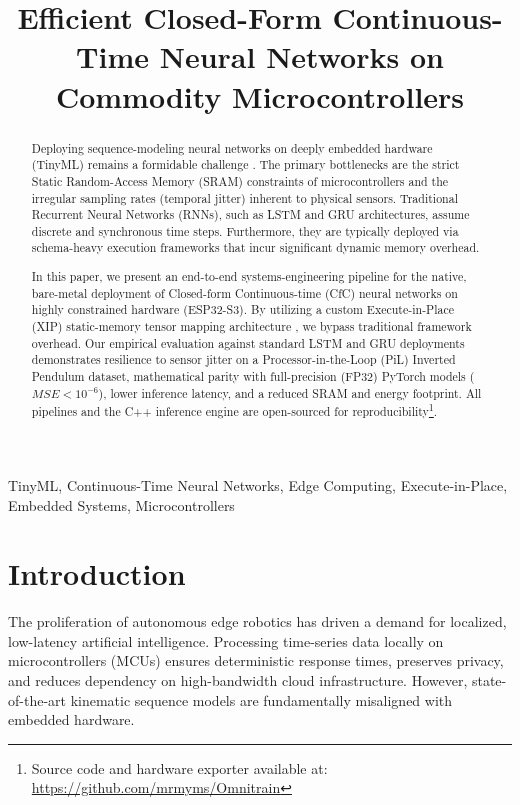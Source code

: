 \documentclass[conference]{IEEEtran}
\begin{document}
\title{Efficient Closed-Form Continuous-Time Neural Networks on Commodity Microcontrollers}

\author{
}

\maketitle

\begin{abstract}
Deploying sequence-modeling neural networks on deeply embedded hardware (TinyML) remains a formidable challenge \cite{ji2020tinyml, gao2021tinytl}. The primary bottlenecks are the strict Static Random-Access Memory (SRAM) constraints of microcontrollers and the irregular sampling rates (temporal jitter) inherent to physical sensors. Traditional Recurrent Neural Networks (RNNs), such as LSTM \cite{hochreiter1997long} and GRU \cite{cho2014learning} architectures, assume discrete and synchronous time steps. Furthermore, they are typically deployed via schema-heavy execution frameworks that incur significant dynamic memory overhead. 

In this paper, we present an end-to-end systems-engineering pipeline for the native, bare-metal deployment of Closed-form Continuous-time (CfC) neural networks on highly constrained hardware (ESP32-S3). By utilizing a custom Execute-in-Place (XIP) static-memory tensor mapping architecture \cite{kim2014lowcost}, we bypass traditional framework overhead. Our empirical evaluation against standard LSTM and GRU deployments demonstrates resilience to sensor jitter on a Processor-in-the-Loop (PiL) Inverted Pendulum dataset, mathematical parity with full-precision (FP32) PyTorch models ($MSE < 10^{-6}$), lower inference latency, and a reduced SRAM and energy footprint. All pipelines and the C++ inference engine are open-sourced for reproducibility\footnote{Source code and hardware exporter available at: \url{https://github.com/mrmyms/Omnitrain}}.
\end{abstract}

\begin{IEEEkeywords}
TinyML, Continuous-Time Neural Networks, Edge Computing, Execute-in-Place, Embedded Systems, Microcontrollers
\end{IEEEkeywords}

\section{Introduction}
The proliferation of autonomous edge robotics has driven a demand for localized, low-latency artificial intelligence. Processing time-series data locally on microcontrollers (MCUs) ensures deterministic response times, preserves privacy, and reduces dependency on high-bandwidth cloud infrastructure. However, state-of-the-art kinematic sequence models are fundamentally misaligned with embedded hardware.
\end{document}
